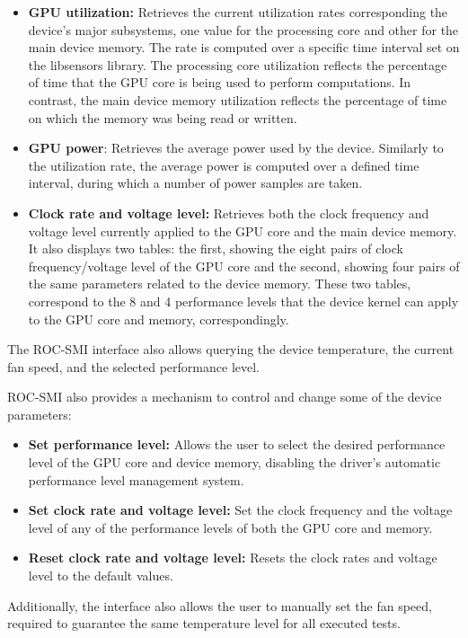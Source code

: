 \begin{itemize}
\item \textbf{GPU utilization:} Retrieves the current utilization rates corresponding the device's major subsystems, one value for the processing core and other for the main device memory. The rate is computed over a specific time interval set on the libsensors library. The processing core utilization reflects the percentage of time that the GPU core is being used to perform computations. In contrast, the main device memory utilization reflects the percentage of time on which the memory was being read or written.

\item \textbf{GPU power}: Retrieves the average power used by the device. Similarly to the utilization rate, the average power is computed over a defined time interval, during which a number of power samples are taken.

\item \textbf{Clock rate and voltage level:} Retrieves both the clock frequency and voltage level currently applied to the GPU core and the main device memory. It also displays two tables: the first, showing the eight pairs of clock frequency/voltage level of the GPU core and the second, showing four pairs of the same parameters related to the device memory. These two tables, correspond to the 8 and 4 performance levels that the device kernel can apply to the GPU core and memory, correspondingly.
\end{itemize}

The ROC-SMI interface also allows querying the device temperature, the current fan speed, and the selected performance level.

ROC-SMI also provides a mechanism to control and change some of the device parameters:
\begin{itemize}
\item \textbf{Set performance level:} Allows the user to select the desired performance level of the GPU core and device memory, disabling the driver's automatic performance level management system.
\item \textbf{Set clock rate and voltage level:} Set the clock frequency and the voltage level of any of the performance levels of both the GPU core and memory. 
\item \textbf{Reset clock rate and voltage level:} Resets the clock rates and voltage level to the default values.
\end{itemize}

Additionally, the interface also allows the user to manually set the fan speed, required to guarantee the same temperature level for all executed tests.

